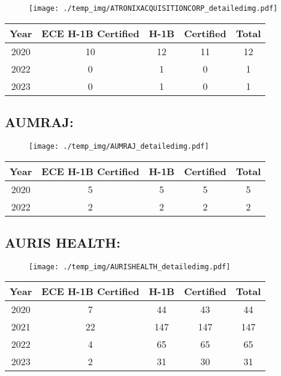 \documentclass{article}%
\begin{document}
\begin{figure}[htbp]%
\centering%
\texttt{[image: ./temp\_img/ATRONIXACQUISITIONCORP\_detailedimg.pdf]}%
\end{figure}

%
\begin{longtable}{c|c|c|c|c}%
\hline%
Year&ECE H{-}1B Certified&H{-}1B&Certified&Total\\%
\hline%
2020&10&12&11&12\\%
\hline%
2022&0&1&0&1\\%
\hline%
2023&0&1&0&1\\%
\hline%
\end{longtable}

%
\newpage%
\subsection{AUMRAJ:}%
\label{subsec:AUMRAJ}%
\label{AUMRAJdetailed}%


\begin{figure}[htbp]%
\centering%
\texttt{[image: ./temp\_img/AUMRAJ\_detailedimg.pdf]}%
\end{figure}

%
\begin{longtable}{c|c|c|c|c}%
\hline%
Year&ECE H{-}1B Certified&H{-}1B&Certified&Total\\%
\hline%
2020&5&5&5&5\\%
\hline%
2022&2&2&2&2\\%
\hline%
\end{longtable}

%
\newpage%
\subsection{AURIS HEALTH:}%
\label{subsec:AURISHEALTH}%
\label{AURISHEALTHdetailed}%


\begin{figure}[htbp]%
\centering%
\texttt{[image: ./temp\_img/AURISHEALTH\_detailedimg.pdf]}%
\end{figure}

%
\begin{longtable}{c|c|c|c|c}%
\hline%
Year&ECE H{-}1B Certified&H{-}1B&Certified&Total\\%
\hline%
2020&7&44&43&44\\%
\hline%
2021&22&147&147&147\\%
\hline%
2022&4&65&65&65\\%
\hline%
2023&2&31&30&31\\%
\hline%
\end{longtable}
\end{document}
